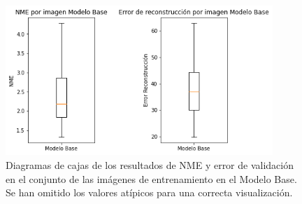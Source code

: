         \newpage
        \begin{figure}[H]
            \centering
            \includegraphics[width=0.9\textwidth]{img/boxplot_modelo_base.png}
            \caption{Diagramas de cajas de los resultados de NME y error de validación en el conjunto de las imágenes de entrenamiento en el Modelo Base. Se han omitido los valores atípicos para una correcta visualización.}
            \label{fig:boxplot_ModeloBase_NME}
        \end{figure}

